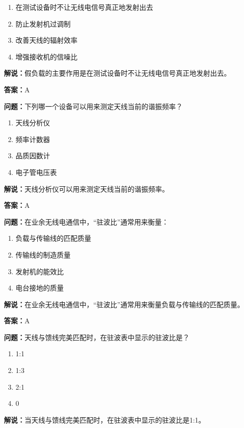 \documentclass[UTF8]{ctexbook}
\begin{document}
\begin{enumerate}[label=\Alph*), leftmargin=3em]
  \item 在测试设备时不让无线电信号真正地发射出去
  \item 防止发射机过调制
  \item 改善天线的辐射效率
  \item 增强接收机的信噪比
\end{enumerate}

\textbf{解说：}假负载的主要作用是在测试设备时不让无线电信号真正地发射出去。%

\textbf{答案：}A

\textbf{问题：}下列哪一个设备可以用来测定天线当前的谐振频率？

\begin{enumerate}[label=\Alph*), leftmargin=3em]
  \item 天线分析仪
  \item 频率计数器
  \item 品质因数计
  \item 电子管电压表
\end{enumerate}

\textbf{解说：}天线分析仪可以用来测定天线当前的谐振频率。

\textbf{答案：}A

\textbf{问题：}在业余无线电通信中，“驻波比”通常用来衡量：

\begin{enumerate}[label=\Alph*), leftmargin=3em]
  \item 负载与传输线的匹配质量
  \item 传输线的制造质量
  \item 发射机的能效比
  \item 电台接地的质量
\end{enumerate}

\textbf{解说：}在业余无线电通信中，“驻波比”通常用来衡量负载与传输线的匹配质量。%

\textbf{答案：}A

\textbf{问题：}天线与馈线完美匹配时，在驻波表中显示的驻波比是？

\begin{enumerate}[label=\Alph*), leftmargin=3em]
  \item 1:1
  \item 1:3
  \item 2:1
  \item 0
\end{enumerate}

\textbf{解说：}当天线与馈线完美匹配时，在驻波表中显示的驻波比是1:1。%
\end{document}
